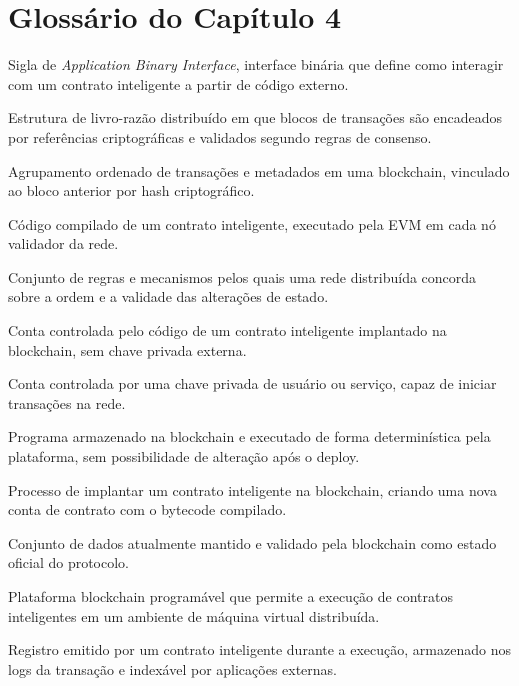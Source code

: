 \chapter*{Glossário do Capítulo 4}

\begin{description}[
  font=\normalfont\bfseries,
  style=multiline,
  leftmargin=5.6cm,
  labelwidth=4.9cm,
  labelsep=0.35cm,
  itemsep=0.55\baselineskip
]
  \item[ABI] Sigla de \textit{Application Binary Interface}, interface binária que define como interagir com um contrato inteligente a partir de código externo.
  \item[Blockchain] Estrutura de livro-razão distribuído em que blocos de transações são encadeados por referências criptográficas e validados segundo regras de consenso.
  \item[Bloco] Agrupamento ordenado de transações e metadados em uma blockchain, vinculado ao bloco anterior por hash criptográfico.
  \item[Bytecode] Código compilado de um contrato inteligente, executado pela EVM em cada nó validador da rede.
  \item[Consenso] Conjunto de regras e mecanismos pelos quais uma rede distribuída concorda sobre a ordem e a validade das alterações de estado.
  \item[Conta de contrato] Conta controlada pelo código de um contrato inteligente implantado na blockchain, sem chave privada externa.
  \item[Conta externa] Conta controlada por uma chave privada de usuário ou serviço, capaz de iniciar transações na rede.
  \item[Contrato inteligente] Programa armazenado na blockchain e executado de forma determinística pela plataforma, sem possibilidade de alteração após o deploy.
  \item[Deploy] Processo de implantar um contrato inteligente na blockchain, criando uma nova conta de contrato com o bytecode compilado.
  \item[Estado on-chain] Conjunto de dados atualmente mantido e validado pela blockchain como estado oficial do protocolo.
  \item[Ethereum] Plataforma blockchain programável que permite a execução de contratos inteligentes em um ambiente de máquina virtual distribuída.
  \item[Evento] Registro emitido por um contrato inteligente durante a execução, armazenado nos logs da transação e indexável por aplicações externas.

\end{description}
